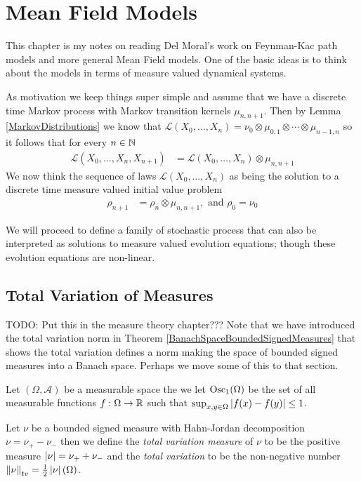 \chapter{Mean Field Models}

This chapter is my notes on reading Del Moral's work on Feynman-Kac path models and more general Mean Field models.  One of the basic ideas is to think about the models in terms of measure valued dynamical systems.  

As motivation we keep things super simple and assume that we have a discrete time Markov process with Markov transition kernels $\mu_{n, n+1}$.  Then by Lemma \ref{MarkovDistributions} we know
that $\mathcal{L}(X_0, \dotsc, X_n) = \nu_0 \otimes \mu_{0,1} \otimes \dotsb \otimes \mu_{n-1, n}$ so it follows that for every $n \in \mathbb{N}$
\begin{align*}
\mathcal{L}(X_0, \dotsc, X_n, X_{n+1}) &= \mathcal{L}(X_0, \dotsc, X_n) \otimes \mu_{n, n+1}
\end{align*}
We now think the sequence of laws $\mathcal{L}(X_0, \dotsc, X_n)$ as being the solution to a discrete time measure valued initial value problem 
\begin{align*}
\rho_{n+1} &= \rho_n \otimes \mu_{n,n+1}, \text{ and $\rho_0=\nu_0$}
\end{align*}

We will proceed to define a family of stochastic process that can also be interpreted as solutions to measure valued evolution equations; though these evolution equations are non-linear.

\section{Total Variation of Measures}

TODO: Put this in the measure theory chapter???  Note that we have introduced the total variation norm in Theorem \ref{BanachSpaceBoundedSignedMeasures}  that shows the total variation defines a norm making the space of bounded signed measures into a Banach space.  Perhaps we move some of this to that section.

\begin{defn}Let $(\Omega, \mathcal{A})$ be a measurable space the we let $\Osc1(\Omega)$ be the set of all measurable functions $f : \Omega \to \mathbb{R}$ such that $\sup_{x,  y  \in \Omega} \left \vert f(x) - f(y) \right \vert \leq 1$.
\end{defn}


\begin{defn}Let $\nu$ be a bounded signed measure with Hahn-Jordan decomposition $\nu = \nu_+ - \nu_-$ then we define the \emph{total variation measure} of $\nu$ to be the positive measure $\left \vert \nu \right \vert = \nu_+ + \nu_-$ and the \emph{total variation} to be the non-negative number $\left \lVert  \nu \right \rVert_{tv} = \frac{1}{2}\left \vert \nu \right \vert(\Omega)$.
\end{defn}

